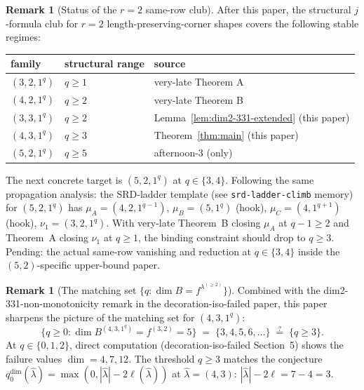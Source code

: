 \documentclass[11pt]{article}
\theoremstyle{definition}
\newtheorem{remark}[theorem]{Remark}
\begin{document}
\begin{remark}[Status of the $r = 2$ same-row club]\label{rem:club-status}
After this paper, the structural $j$-formula club for $r = 2$
length-preserving-corner shapes covers the following stable regimes:
\begin{center}
\renewcommand{\arraystretch}{1.15}
\begin{tabular}{lll}
\toprule
family & structural range & source \\
\midrule
$(3, 2, 1^q)$ & $q \ge 1$ & very-late Theorem A \\
$(4, 2, 1^q)$ & $q \ge 2$ & very-late Theorem B \\
$(3, 3, 1^q)$ & $q \ge 2$ & Lemma~\ref{lem:dim2-331-extended} (this paper) \\
$(4, 3, 1^q)$ & $q \ge 3$ & Theorem~\ref{thm:main} (this paper) \\
$(5, 2, 1^q)$ & $q \ge 5$ & afternoon-3 (only) \\
\bottomrule
\end{tabular}
\end{center}

The next concrete target is $(5, 2, 1^q)$ at $q \in \{3, 4\}$.
Following the same propagation analysis: the SRD-ladder template
(see \texttt{srd-ladder-climb} memory) for $(5, 2, 1^q)$ has
$\mu_A = (4, 2, 1^{q-1})$, $\mu_B = (5, 1^q)$ (hook),
$\mu_C = (4, 1^{q+1})$ (hook), $\nu_1 = (3, 2, 1^q)$.
With very-late Theorem~B closing $\mu_A$ at $q - 1 \ge 2$ and
Theorem~A closing $\nu_1$ at $q \ge 1$, the binding constraint
should drop to $q \ge 3$. Pending: the actual same-row vanishing
and reduction at $q \in \{3, 4\}$ inside the $(5, 2)$-specific
upper-bound paper.
\end{remark}

\begin{remark}[The matching set $\{q : \dim B = f^{\lambda^{(\ge 2)}}\}$]\label{rem:matching}
Combined with the dim2-331-non-monotonicity remark in the
decoration-iso-failed paper, this paper sharpens the picture of the
matching set for $(4, 3, 1^q)$:
\[
   \{q \ge 0 : \dim B^{(4, 3, 1^q)} = f^{(3, 2)} = 5\}
   \;=\; \{3, 4, 5, 6, \ldots\}
   \;\stackrel{?}{=}\; \{q \ge 3\}.
\]
At $q \in \{0, 1, 2\}$, direct computation (decoration-iso-failed
Section~5) shows the failure values $\dim = 4, 7, 12$.
The threshold $q \ge 3$ matches the conjecture
$q_0^{\dim}(\widehat\lambda) = \max(0, |\widehat\lambda| - 2\ell(\widehat\lambda))$
at $\widehat\lambda = (4, 3)$: $|\widehat\lambda| - 2\ell = 7 - 4 = 3$.
\end{remark}
\end{document}
